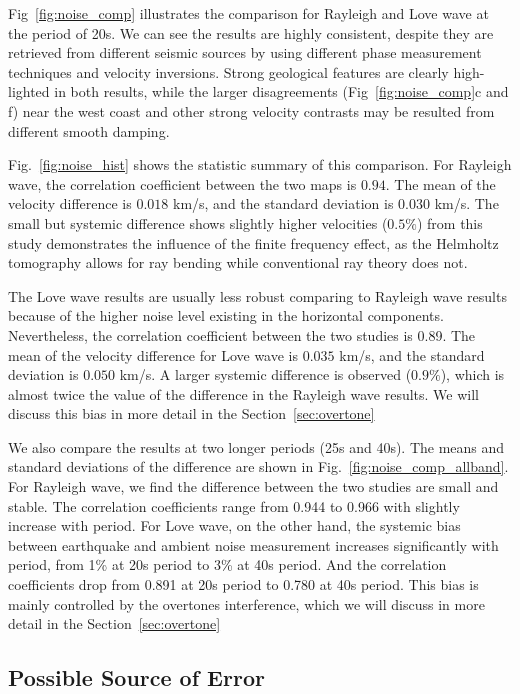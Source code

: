 \documentclass[referee]{gji}
\begin{document}
Fig~\ref{fig:noise_comp} illustrates the comparison for Rayleigh and Love wave at the period of 20s. We can see the results are highly consistent, despite they are retrieved from different seismic sources by using different phase measurement techniques and velocity inversions. Strong geological features are clearly high-lighted in both results, while the larger disagreements (Fig~\ref{fig:noise_comp}c and f) near the west coast and other strong velocity contrasts may be resulted from different smooth damping. 

Fig.~\ref{fig:noise_hist} shows the statistic summary of this comparison. For Rayleigh wave, the correlation coefficient between the two maps is $0.94$. The mean of the velocity difference is $0.018$ km/s, and the standard deviation is $0.030$ km/s.  The small but systemic difference shows slightly higher velocities ($0.5\%$) from this study demonstrates the influence of the finite frequency effect, as the Helmholtz tomography allows for ray bending while conventional ray theory does not. 

The Love wave results are usually less robust comparing to Rayleigh wave results because of the higher noise level existing in the horizontal components. Nevertheless, the correlation coefficient between the two studies is 0.89. The mean of the velocity difference for Love wave is $0.035$ km/s, and the standard deviation is $0.050$ km/s. A larger systemic difference is observed ($0.9\%$), which is almost twice the value of the difference in the Rayleigh wave results. We will discuss this bias in more detail in the Section~\ref{sec:overtone}

We also compare the results at two longer periods (25s and 40s). The means and standard deviations of the difference are shown in Fig.~\ref{fig:noise_comp_allband}. For Rayleigh wave, we find the difference between the two studies are small and stable. The correlation coefficients range from 0.944 to 0.966 with slightly increase with period. For Love wave, on the other hand, the systemic bias between earthquake and ambient noise measurement increases significantly with period, from 1\% at 20s period to 3\% at 40s period. And the correlation coefficients drop from 0.891 at 20s period to 0.780 at 40s period. This bias is mainly controlled by the overtones interference, which we will discuss in more detail in the Section~\ref{sec:overtone}

\subsection{Possible Source of Error}
\end{document}
